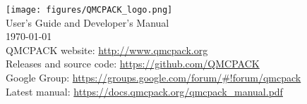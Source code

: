 
\begin{titlepage}
\vspace*{\fill}
\begin{center}

\texttt{[image: figures/QMCPACK\_logo.png]} \\
{\huge User's Guide and Developer's Manual \\}
{
\huge %
\today}\\
\vspace{2.5cm}
{\small QMCPACK website: \url{http://www.qmcpack.org}}\\
{\small Releases and source code:  \url{https://github.com/QMCPACK}}\\
{\small Google Group: \url{https://groups.google.com/forum/#!forum/qmcpack}}\\
{\small Latest manual: \url{https://docs.qmcpack.org/qmcpack_manual.pdf}}
\end{center}
\vspace*{\fill}
\end{titlepage}
